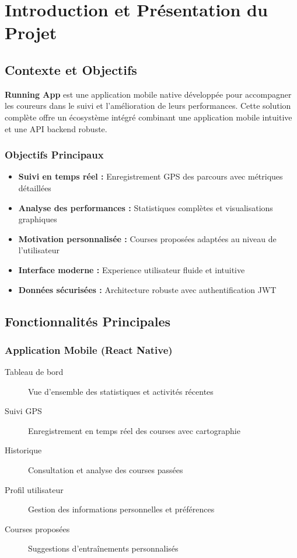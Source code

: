 \section{Introduction et Présentation du Projet}

\subsection{Contexte et Objectifs}

\textbf{Running App} est une application mobile native développée pour accompagner les coureurs dans le suivi et l'amélioration de leurs performances. Cette solution complète offre un écosystème intégré combinant une application mobile intuitive et une API backend robuste.

\subsubsection{Objectifs Principaux}

\begin{itemize}[label=\textcolor{primarycolor}{$\bullet$}]
    \item \textbf{Suivi en temps réel :} Enregistrement GPS des parcours avec métriques détaillées
    \item \textbf{Analyse des performances :} Statistiques complètes et visualisations graphiques
    \item \textbf{Motivation personnalisée :} Courses proposées adaptées au niveau de l'utilisateur
    \item \textbf{Interface moderne :} Experience utilisateur fluide et intuitive
    \item \textbf{Données sécurisées :} Architecture robuste avec authentification JWT
\end{itemize}

\subsection{Fonctionnalités Principales}

\subsubsection{Application Mobile (React Native)}

\begin{description}
    \item[Tableau de bord] Vue d'ensemble des statistiques et activités récentes
    \item[Suivi GPS] Enregistrement en temps réel des courses avec cartographie
    \item[Historique] Consultation et analyse des courses passées
    \item[Profil utilisateur] Gestion des informations personnelles et préférences
    \item[Courses proposées] Suggestions d'entraînements personnalisés
\end{description}

